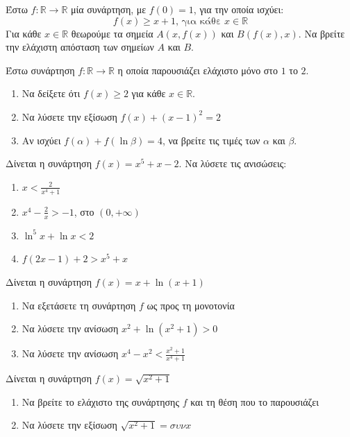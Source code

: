 \documentclass{presentation}
\begin{document}
\begin{askisi}
  Έστω $f:\mathbb{R}\to\mathbb{R}$ μία συνάρτηση, με $f(0)=1$, για την οποία ισχύει:
  $$f(x)\ge x+1 \text{, για κάθε } x\in\mathbb{R}$$
  Για κάθε $x\in\mathbb{R}$ θεωρούμε τα σημεία $Α(x,f(x))$ και $Β(f(x),x)$. Να βρείτε την ελάχιστη απόσταση των σημείων $Α$ και $Β$.

\end{askisi}

\begin{askisi}
  Έστω συνάρτηση $f:\mathbb{R}\to \mathbb{R}$ η οποία παρουσιάζει ελάχιστο μόνο στο $1$ το $2$.
  \begin{enumerate}
    \item Να δείξετε ότι $f(x)\ge 2$ για κάθε $x\in\mathbb{R}$. \pause
    \item Να λύσετε την εξίσωση $f(x)+(x-1)^2=2$ \pause
    \item Αν ισχύει $f(α)+f(\ln β)=4$, να βρείτε τις τιμές των $α$ και $β$.
  \end{enumerate}

\end{askisi}

\begin{askisi}
  Δίνεται η συνάρτηση $f(x)=x^5+x-2$. Να λύσετε τις ανισώσεις:
  \begin{enumerate}
    \item $x<\frac{2}{x^4+1}$ \pause
    \item $x^4-\frac{2}{x}>-1$, στο $(0,+\infty)$ \pause
    \item $\ln^5 x+\ln x<2$ \pause
    \item $f(2x-1)+2>x^5+x$
  \end{enumerate}

\end{askisi}

\begin{askisi}
  Δίνεται η συνάρτηση $f(x)=x+\ln (x+1)$
  \begin{enumerate}
    \item Να εξετάσετε τη συνάρτηση $f$ ως προς τη μονοτονία \pause
    \item Να λύσετε την ανίσωση $x^2+\ln (x^2+1)>0$ \pause
    \item Να λύσετε την ανίσωση $x^4-x^2<\frac{x^2+1}{x^4+1}$
  \end{enumerate}

\end{askisi}

\begin{askisi}
  Δίνεται η συνάρτηση $f(x)=\sqrt{x^2+1}$
  \begin{enumerate}
    \item Να βρείτε το ελάχιστο της συνάρτησης $f$ και τη θέση που το παρουσιάζει \pause
    \item Να λύσετε την εξίσωση $\sqrt{x^2+1}=συνx$
  \end{enumerate}

\end{askisi}
\end{document}
